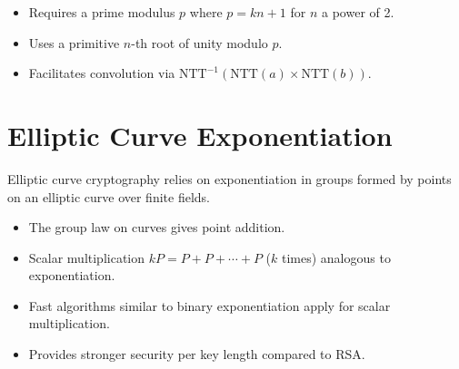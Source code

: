 \documentclass[12pt,openany]{book}
\theoremstyle{definition}
\theoremstyle{plain}
\theoremstyle{remark}
\begin{document}
\begin{itemize}
  \item Requires a prime modulus $p$ where $p = k n + 1$ for $n$ a power of 2.
  \item Uses a primitive $n$-th root of unity modulo $p$.
  \item Facilitates convolution via $\text{NTT}^{-1}(\text{NTT}(a)\times \text{NTT}(b))$.
\end{itemize}

\section{Elliptic Curve Exponentiation}

Elliptic curve cryptography relies on exponentiation in groups formed by points on an elliptic curve over finite fields.

\begin{itemize}
  \item The group law on curves gives point addition.
  \item Scalar multiplication $kP = P + P + \cdots + P$ ($k$ times) analogous to exponentiation.
  \item Fast algorithms similar to binary exponentiation apply for scalar multiplication.
  \item Provides stronger security per key length compared to RSA.
\end{itemize}
\end{document}
